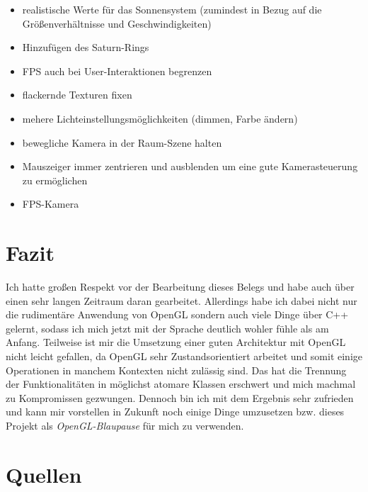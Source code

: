 \documentclass{article}
\let\oldsection\section
\renewcommand\section{\needspace{10\baselineskip}\oldsection}
\begin{document}
\begin{itemize}
    \item realistische Werte für das Sonnensystem (zumindest in Bezug auf die Größenverhältnisse und Geschwindigkeiten)
    \item Hinzufügen des Saturn-Rings
    \item FPS auch bei User-Interaktionen begrenzen
    \item flackernde Texturen fixen
    \item mehere Lichteinstellungsmöglichkeiten (dimmen, Farbe ändern)
    \item bewegliche Kamera in der Raum-Szene halten
    \item Mauszeiger immer zentrieren und ausblenden um eine gute Kamerasteuerung zu ermöglichen
    \item FPS-Kamera
\end{itemize}

\clearpage

\section{Fazit}
Ich hatte großen Respekt vor der Bearbeitung dieses Belegs und habe auch über einen sehr langen Zeitraum daran gearbeitet.
Allerdings habe ich dabei nicht nur die rudimentäre Anwendung von OpenGL sondern auch viele Dinge über C++ gelernt, sodass ich mich jetzt mit der Sprache deutlich wohler fühle als am Anfang.
Teilweise ist mir die Umsetzung einer guten Architektur mit OpenGL nicht leicht gefallen, da OpenGL sehr Zustandsorientiert arbeitet und somit einige Operationen in manchem Kontexten nicht zulässig sind.
Das hat die Trennung der Funktionalitäten in möglichst atomare Klassen erschwert und mich machmal zu Kompromissen gezwungen.
Dennoch bin ich mit dem Ergebnis sehr zufrieden und kann mir vorstellen in Zukunft noch einige Dinge umzusetzen bzw. dieses Projekt als \textit{OpenGL-Blaupause} für mich zu verwenden.

\clearpage

\section{Quellen}
\end{document}
